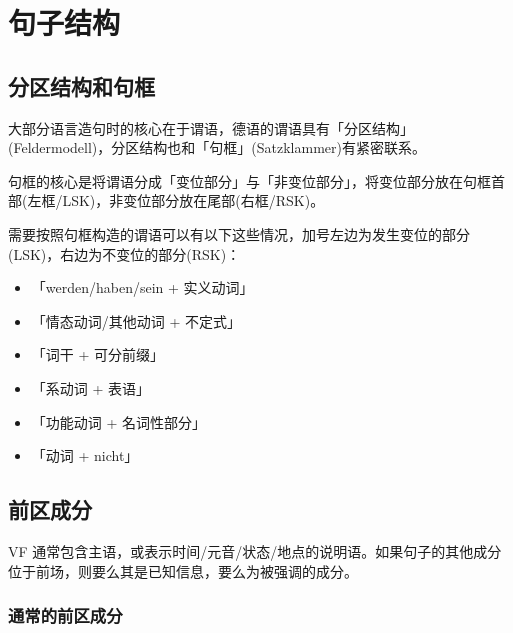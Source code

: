 \section{句子结构}

\subsection{分区结构和句框}
\begin{figure}[H]
    \centering
    
\end{figure}

大部分语言造句时的核心在于谓语，德语的谓语具有「分区结构」(Feldermodell)，分区结构也和「句框」(Satzklammer)有紧密联系。

句框的核心是将谓语分成「变位部分」与「非变位部分」，将变位部分放在句框首部(左框/LSK)，非变位部分放在尾部(右框/RSK)。


需要按照句框构造的谓语可以有以下这些情况，加号左边为发生变位的部分(LSK)，右边为不变位的部分(RSK)：
\begin{itemize}
    \item「werden/haben/sein + 实义动词」
    \item 「情态动词/其他动词 + 不定式」
    \item 「词干 + 可分前缀」
    \item 「系动词 + 表语」
    \item 「功能动词 + 名词性部分」
    \item 「动词 + nicht」
\end{itemize}

\subsection{前区成分}
VF 通常包含主语，或表示时间/元音/状态/地点的说明语。如果句子的其他成分位于前场，则要么其是已知信息，要么为被强调的成分。

\subsubsection{通常的前区成分}

